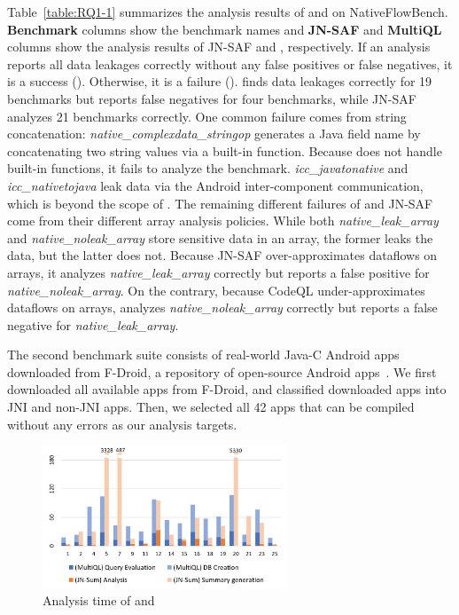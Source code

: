 Table~\ref{table:RQ1-1} summarizes the analysis
results of \jnsaf and \ours on NativeFlowBench.
{\bf Benchmark} columns show the benchmark names
and {\bf JN-SAF} and {\bf MultiQL} columns show 
the analysis results of JN-SAF and \ours, respectively.
If an analysis reports all data leakages correctly without any
false positives or false negatives, it is a success (\cmark).
Otherwise, it is a failure (\xmark).
\ours finds data leakages correctly for 19 benchmarks but reports false
negatives for four benchmarks, while JN-SAF analyzes 21 benchmarks correctly. 
One common failure comes from string concatenation:
{\it native\_complexdata\_stringop} generates a Java field name by
concatenating two string values via a built-in function.
Because \ours does not handle built-in functions, it fails to analyze the benchmark.
{\it icc\_javatonative} and {\it icc\_nativetojava} leak data via the Android
inter-component communication, which is beyond the scope of \ours.
The remaining different failures of \ours and JN-SAF come from
their different array analysis policies.
While both {\it native\_leak\_array} and {\it native\_noleak\_array} store sensitive data in an array,
the former leaks the data, but the latter does not.
Because JN-SAF over-approximates dataflows on arrays,
it analyzes {\it native\_leak\_array} correctly but reports a false positive for {\it native\_noleak\_array}.
On the contrary, because CodeQL under-approximates dataflows on arrays,
\ours analyzes {\it native\_noleak\_array} correctly but reports a false negative for
{\it native\_leak\_array}.

The second benchmark suite consists of real-world Java-C Android apps downloaded from
F-Droid, a repository of open-source Android apps~\cite{fdroid}.  We first
downloaded all available apps from F-Droid, and classified downloaded apps into JNI and non-JNI apps.
Then, we selected all 42 apps that can be compiled without any errors as our analysis targets.



\begin{figure}
  \centering
  \vspace{2mm}
  \includegraphics[width=0.65\textwidth]{img/graph}
  \vspace*{-.5em}
  \caption{Analysis time of \ours and \lees}
  \label{fig:graph}
\vspace*{-1em}
\end{figure}

